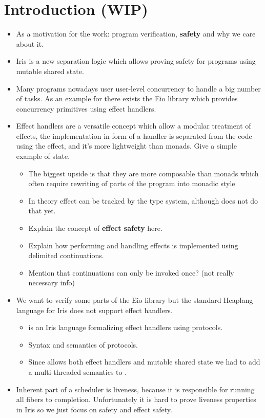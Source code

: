 \section{Introduction (WIP)}
\label{sec:introduction}

\begin{itemize}
  \item As a motivation for the work: program verification, \textbf{safety} and why we care about it.
  \item Iris is a new separation logic which allows proving safety for programs using mutable shared state.
  \item Many programs nowadays user user-level concurrency to handle a big number of tasks. As an example for \ocf{} there exists the Eio library which provides concurrency primitives using effect handlers.
  \item Effect handlers are a versatile concept which allow a modular treatment of effects, the implementation in form of a handler is separated from the code using the effect, and it's more lightweight than monads. Give a simple example of state.
        \begin{itemize}
          \item The biggest upside is that they are more composable than monads which often require rewriting of parts of the program into monadic style
          \item In theory effect can be tracked by the type system, although \ocf{} does not do that yet.
          \item Explain the concept of \textbf{effect safety} here.
          \item Explain how performing and handling effects is implemented using delimited continuations.
          \item Mention that continuations can only be invoked once? (not really necessary info)
        \end{itemize}
  \item We want to verify some parts of the Eio library but the standard Heaplang language for Iris does not support effect handlers.
        \begin{itemize}
          \item \hazel{} is an Iris language formalizing effect handlers using protocols.
          \item Syntax and semantics of protocols.
          \item Since \ocf{} allows both effect handlers and mutable shared state we had to add a multi-threaded semantics to \hazel{}.
        \end{itemize}
  \item Inherent part of a scheduler is liveness, because it is responsible for running all fibers to completion. Unfortunately it is hard to prove liveness properties in Iris so we just focus on safety and effect safety.
\end{itemize}

